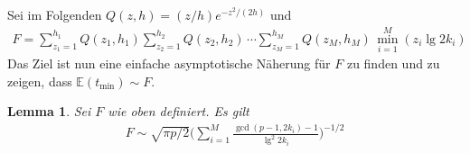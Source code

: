 \documentclass[a4paper, 11pt, ngerman]{article}
\newcommand{\E}{\mathbb{E}}
\theoremstyle{definition}
\theoremstyle{plain}
\newtheorem{lemma}{Lemma}
\theoremstyle{remark}
\begin{document}
Sei im Folgenden $Q(z, h) = (z/h) e^{-z^2/(2h)}$ und
\begin{align*}
    F =
    \sum_{z_1 = 1}^{h_1} Q(z_1, h_1)
    \sum_{z_2 = 1}^{h_2} Q(z_2, h_2) \, \cdots
    \sum_{z_M = 1}^{h_M} Q(z_M, h_M)
    \, \min_{i = 1}^M(z_i \lg 2k_i)
\end{align*}
Das Ziel ist nun eine einfache asymptotische Näherung für $F$ zu finden und zu zeigen, dass $\E(t_{\min}) \sim F$.

\begin{lemma}
    Sei $F$ wie oben definiert. Es gilt
    \begin{align*}
        F \sim \sqrt{\pi p / 2} \Bigg ( \sum_{i = 1}^M \frac {\gcd(p - 1, 2k_i) - 1} {\lg^2 2k_i} \Bigg )^{-1/2}
    \end{align*}

    \label{lemma:f-asmyp}
\end{lemma}
\end{document}
